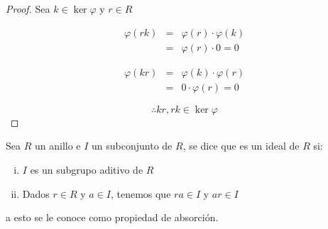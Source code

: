     \begin{proof}
        Sea $k \in \ker{\varphi}$ y $r \in R$

        \begin{eqnarray*}
            \varphi(rk) & = & \varphi(r) \cdot \varphi(k) \\
            & = & \varphi(r) \cdot 0 = 0
        \end{eqnarray*}

        \begin{eqnarray*}
            \varphi(kr) & = & \varphi(k) \cdot \varphi(r) \\
            & = & 0 \cdot \varphi(r) = 0
        \end{eqnarray*}

        \begin{equation*}
            \therefore kr, rk \in \ker{\varphi}
        \end{equation*}
    \end{proof}

    \begin{definicion}
        Sea $R$ un anillo e $I$ un subconjunto de $R$, se dice que es un ideal de $R$ si:

        \begin{enumerate}[i)]
            \item $I$ es un subgrupo aditivo de $R$
            \item Dados $r \in R$ y $a \in I$, tenemos que $ra \in I$ y $ar \in I$
        \end{enumerate}

        a esto se le conoce como propiedad de absorción.
    \end{definicion}
